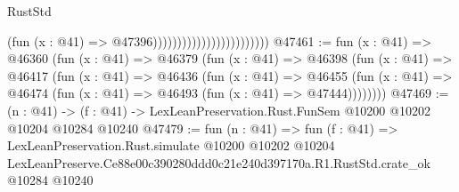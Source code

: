 \begin{lexlean}{RustStd}
\begin{coremodule}
                                                  (fun (x : @41) => @47396))))))))))))))))))))))))
@47461 := fun (x : @41) =>
  @46360
    (fun (x : @41) =>
    @46379
      (fun (x : @41) =>
      @46398
        (fun (x : @41) =>
        @46417
          (fun (x : @41) =>
          @46436
            (fun (x : @41) =>
            @46455
              (fun (x : @41) => @46474 (fun (x : @41) => @46493 (fun (x : @41) => @47444))))))))
@47469 := (n : @41) ->
  (f : @41) -> LexLeanPreservation.Rust.FunSem @10200 @10202 @10204 @10284 @10240
@47479 := fun (n : @41) =>
  fun (f : @41) =>
  LexLeanPreservation.Rust.simulate
    @10200
    @10202
    @10204
    LexLeanPreserve.Ce88e00c390280ddd0c21e240d397170a.R1.RustStd.crate_ok
    @10284
    @10240
\end{coremodule}
\end{lexlean}
